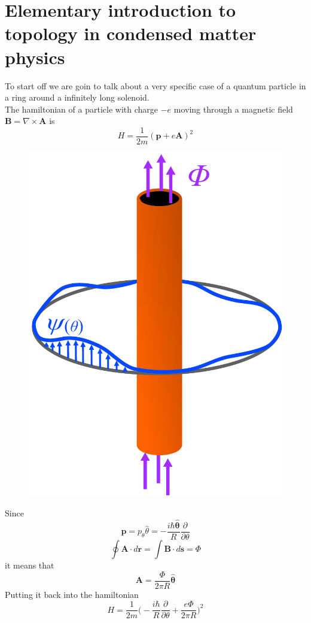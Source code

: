 \label{sec:no_flat}
\section{Elementary introduction to topology in condensed matter physics}
    
        
        To start off we are goin to talk about a very specific case of a quantum particle in a ring around a infinitely long solenoid.\\
        The hamiltonian of a particle with charge $-e$ moving through a magnetic field $\mathbf B= \nabla \times \mathbf A$ is
        \begin{equation} \label{EMHamiltonian}
                H=\frac 1{2m}(\mathbf p + e\mathbf A)^2 
        \end{equation}
        \begin{figure}
            \includegraphics[width=.4\textwidth]{Immagini/topo/solenoid.pdf}
        \end{figure} 
        Since 
        \[\mathbf p=p_\theta \hat\theta=-\frac{i\hbar\mathbf {\hat \theta}}{R}\frac\partial {\partial \theta}\]
        \[
            \oint \mathbf A\cdot d\mathbf r=\int \mathbf B\cdot d\mathbf s = \Phi
        \]   
        it means that
        \begin{equation} \label{vector_potential}
            \mathbf A=\frac \Phi{2\pi R} \mathbf {\hat \theta}
        \end{equation}
        Putting it back into the hamiltonian
        \begin{equation} \label{EMHamiltonian2}
            H=\frac 1{2m}\bigg(-\frac{i\hbar}{R}\frac\partial {\partial \theta} + \frac{e\Phi}{2\pi R}\bigg)^2 
        \end{equation}
